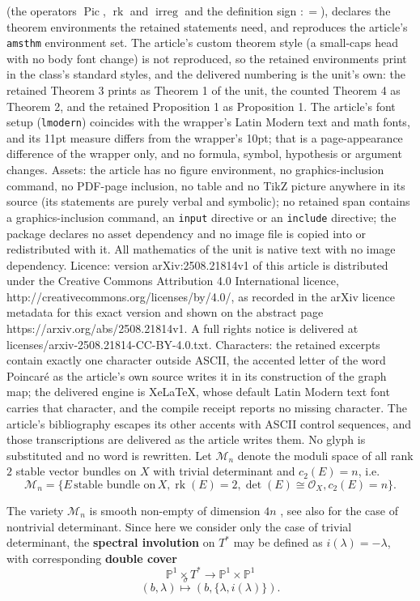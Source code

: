 \documentclass[10pt,a4paper]{amsart}
\theoremstyle{plain}
\theoremstyle{definition}
\theoremstyle{remark}
\DeclareMathOperator{\Pic}{Pic}
\DeclareMathOperator{\rk}{rk}
\DeclareMathOperator{\irreg}{irreg}
\newcommand{\ce}{\mathrel{\mathop:}=}
\begin{document}
(the operators $\Pic$, $\rk$ and $\irreg$ and the definition sign $\ce$), declares the theorem environments the retained statements need, and reproduces the article's \texttt{amsthm} environment set. The article's custom theorem style (a small-caps head with no body font change) is not reproduced, so the retained environments print in the class's standard styles, and the delivered numbering is the unit's own: the retained Theorem 3 prints as Theorem 1 of the unit, the counted Theorem 4 as Theorem 2, and the retained Proposition 1 as Proposition 1. The article's font setup (\texttt{lmodern}) coincides with the wrapper's Latin Modern text and math fonts, and its 11pt measure differs from the wrapper's 10pt; that is a page-appearance difference of the wrapper only, and no formula, symbol, hypothesis or argument changes. Assets: the article has no figure environment, no graphics-inclusion command, no PDF-page inclusion, no table and no TikZ picture anywhere in its source (its statements are purely verbal and symbolic); no retained span contains a graphics-inclusion command, an \texttt{input} directive or an \texttt{include} directive; the package declares no asset dependency and no image file is copied into or redistributed with it. All mathematics of the unit is native text with no image dependency. Licence: version arXiv:2508.21814v1 of this article is distributed under the Creative Commons Attribution 4.0 International licence, http://creativecommons.org/licenses/by/4.0/, as recorded in the arXiv licence metadata for this exact version and shown on the abstract page https://arxiv.org/abs/2508.21814v1. A full rights notice is delivered at licenses/arxiv-2508.21814-CC-BY-4.0.txt. Characters: the retained excerpts contain exactly one character outside ASCII, the accented letter of the word Poincar\'e as the article's own source writes it in its construction of the graph map; the delivered engine is XeLaTeX, whose default Latin Modern text font carries that character, and the compile receipt reports no missing character. The article's bibliography escapes its other accents with ASCII control sequences, and those transcriptions are delivered as the article writes them. No glyph is substituted and no word is rewritten.
Let $\mathcal M_n$ denote the moduli space
of all rank $2$ stable vector bundles on $X$ with trivial determinant and $c_2(E)=n$, i.e.
$$\mathcal M_n=\{E\,  \text{stable  bundle on} \, X,   \rk(E)=2, \det(E)\cong \mathcal O_X, c_2(E)=n\}.$$




The variety $\mathcal M_n$ is  smooth non-empty    of dimension 
$4n$ \cite[Prop..4]{BH}, see also 
\cite[Prop.]{BMo} for the case of nontrivial determinant.
Since here we consider only the case of trivial determinant,  the 
{\bf spectral involution} on $T^*$ may be defined 
as $i(\lambda) = -\lambda$, with corresponding {\bf double cover} 
\begin{equation}\label{dc}\mathbb P^1 \times T^* \to \mathbb P^1 \times \mathbb P^1\end{equation} 
$$(b, \lambda) \stackrel{\sigma}{\mapsto} (b, \{\lambda, i(\lambda)\}).$$
\end{document}
